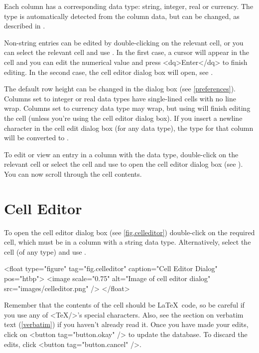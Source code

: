 Each column has a corresponding data type: string, integer, real
or currency. The type is automatically detected from the column data,
but can be changed, as described in .

Non-string entries can be edited by double-clicking on the relevant cell, 
or you can select the relevant cell and use .
In the first case, a cursor will appear in the cell and you 
can edit the numerical value and press <dq>Enter</dq> to finish 
editing. In the second case, the cell editor dialog box will 
open, see .

 The default row height can be changed in the
 dialog box (see \autoref{preferences}).
Columns set to integer or real data types have single-lined cells with no
line wrap. Columns set to currency data type may wrap, but using 
 will finish editing the cell (unless you're using the cell
editor dialog box). If you insert a newline character in the cell
edit dialog box (for any data type), the type for that column will 
be converted to .

To edit or view an entry in a column
with the  data type, double-click on the relevant cell or 
select the cell and use  to open the cell editor 
dialog box (see ). You can now scroll through
the cell contents.

\section{Cell Editor}\label{celleditor}

   To open the cell editor dialog box (see \autoref{fig.celleditor})
   double-click on the required cell, which must be in a column with a 
   string data type. Alternatively, select the cell (of any type) and use 
   .

   <float type="figure" tag="fig.celleditor" caption="Cell Editor Dialog" pos="htbp">
     <image scale="0.75" alt="Image of cell editor dialog" src="images/celleditor.png" />
   </float>

   Remember that the contents of the cell should be \LaTeX\ code, so be
   careful if you use any of <TeX/>'s special characters. Also, see the
   section on verbatim text (\autoref{verbatim}) if you haven't 
   already read it.
   Once you have made your edits, click on <button tag="button.okay" />
   to update the database. To discard the edits, click 
   <button tag="button.cancel" />.


